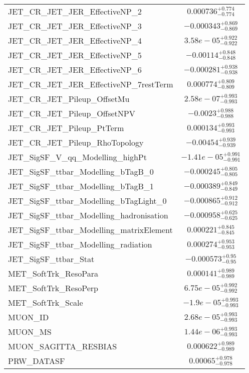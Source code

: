 \begin{tabular}{|l|c|}
JET\_CR\_JET\_JER\_EffectiveNP\_2 & $0.000736^{+0.774}_{-0.774}$ \\
JET\_CR\_JET\_JER\_EffectiveNP\_3 & $-0.000343^{+0.869}_{-0.869}$ \\
JET\_CR\_JET\_JER\_EffectiveNP\_4 & $3.58e-05^{+0.922}_{-0.922}$ \\
JET\_CR\_JET\_JER\_EffectiveNP\_5 & $-0.00114^{+0.848}_{-0.848}$ \\
JET\_CR\_JET\_JER\_EffectiveNP\_6 & $-0.000281^{+0.938}_{-0.938}$ \\
JET\_CR\_JET\_JER\_EffectiveNP\_7restTerm & $0.000774^{+0.809}_{-0.809}$ \\
JET\_CR\_JET\_Pileup\_OffsetMu & $2.58e-07^{+0.993}_{-0.993}$ \\
JET\_CR\_JET\_Pileup\_OffsetNPV & $-0.0023^{+0.988}_{-0.988}$ \\
JET\_CR\_JET\_Pileup\_PtTerm & $0.000134^{+0.993}_{-0.993}$ \\
JET\_CR\_JET\_Pileup\_RhoTopology & $-0.00454^{+0.939}_{-0.939}$ \\
JET\_SigSF\_V\_qq\_Modelling\_highPt & $-1.41e-05^{+0.991}_{-0.991}$ \\
JET\_SigSF\_ttbar\_Modelling\_bTagB\_0 & $-0.000245^{+0.805}_{-0.805}$ \\
JET\_SigSF\_ttbar\_Modelling\_bTagB\_1 & $-0.000389^{+0.849}_{-0.849}$ \\
JET\_SigSF\_ttbar\_Modelling\_bTagLight\_0 & $-0.000865^{+0.912}_{-0.912}$ \\
JET\_SigSF\_ttbar\_Modelling\_hadronisation & $-0.000958^{+0.625}_{-0.625}$ \\
JET\_SigSF\_ttbar\_Modelling\_matrixElement & $0.000221^{+0.845}_{-0.845}$ \\
JET\_SigSF\_ttbar\_Modelling\_radiation & $0.000274^{+0.953}_{-0.953}$ \\
JET\_SigSF\_ttbar\_Stat & $-0.000573^{+0.95}_{-0.95}$ \\
MET\_SoftTrk\_ResoPara & $0.000141^{+0.989}_{-0.989}$ \\
MET\_SoftTrk\_ResoPerp & $6.75e-05^{+0.992}_{-0.992}$ \\
MET\_SoftTrk\_Scale & $-1.9e-05^{+0.993}_{-0.993}$ \\
MUON\_ID & $2.68e-05^{+0.993}_{-0.993}$ \\
MUON\_MS & $1.44e-06^{+0.993}_{-0.993}$ \\
MUON\_SAGITTA\_RESBIAS & $0.000622^{+0.989}_{-0.989}$ \\
PRW\_DATASF & $0.00065^{+0.978}_{-0.978}$ \\

\end{tabular}
